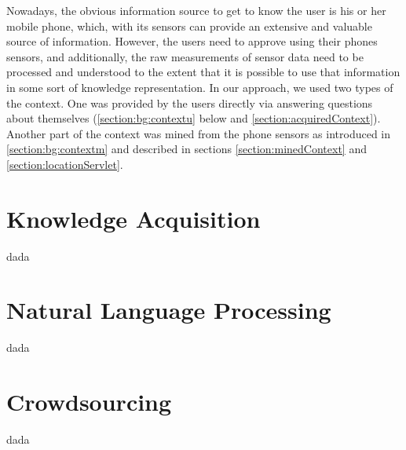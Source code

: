 Nowadays, the obvious information source to get to know the user is his or her
mobile phone, which, with its sensors can provide an extensive and valuable 
source of information. However, the users need to approve using their phones 
sensors, and additionally, the raw measurements of sensor data need to be 
processed and understood to the extent that it is possible to use that 
information in some sort of knowledge representation. In our approach, we used 
two types of the context. One was provided by the users directly via answering 
questions about themselves (\autoref{section:bg:contextu} below and 
\autoref{section:acquiredContext}). Another part 
of the context was mined from the phone sensors as introduced in 
\autoref{section:bg:contextm} and described in sections 
\ref{section:minedContext} and \ref{section:locationServlet}.


\section{Knowledge Acquisition}
\label{section:bg:ka}
dada

\section{Natural Language Processing}
\label{section:bg:nlp}
dada

\section{Crowdsourcing}
\label{section:bg:crowdsourcing}
dada
